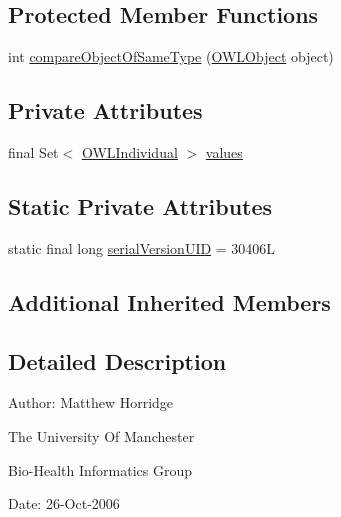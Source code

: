 \subsection*{Protected Member Functions}
\begin{DoxyCompactItemize}
\item 
int \hyperlink{classuk_1_1ac_1_1manchester_1_1cs_1_1owl_1_1owlapi_1_1_o_w_l_object_one_of_impl_a39e1acb8bd62d2f49d3cb1c77c5a4d00}{compare\-Object\-Of\-Same\-Type} (\hyperlink{interfaceorg_1_1semanticweb_1_1owlapi_1_1model_1_1_o_w_l_object}{O\-W\-L\-Object} object)
\end{DoxyCompactItemize}
\subsection*{Private Attributes}
\begin{DoxyCompactItemize}
\item 
final Set$<$ \hyperlink{interfaceorg_1_1semanticweb_1_1owlapi_1_1model_1_1_o_w_l_individual}{O\-W\-L\-Individual} $>$ \hyperlink{classuk_1_1ac_1_1manchester_1_1cs_1_1owl_1_1owlapi_1_1_o_w_l_object_one_of_impl_a168bc7c45fa11bd10943672559a09bba}{values}
\end{DoxyCompactItemize}
\subsection*{Static Private Attributes}
\begin{DoxyCompactItemize}
\item 
static final long \hyperlink{classuk_1_1ac_1_1manchester_1_1cs_1_1owl_1_1owlapi_1_1_o_w_l_object_one_of_impl_a36a2f7bea84b89fc222da55bd000d14f}{serial\-Version\-U\-I\-D} = 30406\-L
\end{DoxyCompactItemize}
\subsection*{Additional Inherited Members}


\subsection{Detailed Description}
Author\-: Matthew Horridge\par
 The University Of Manchester\par
 Bio-\/\-Health Informatics Group\par
 Date\-: 26-\/\-Oct-\/2006\par
 \par
 

